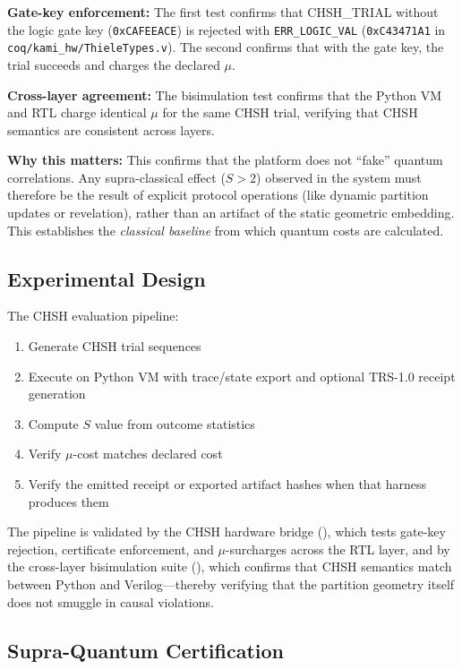 \textbf{Gate-key enforcement:} The first test confirms that CHSH\_TRIAL without the logic gate key (\texttt{0xCAFEEACE}) is rejected with \texttt{ERR\_LOGIC\_VAL} (\texttt{0xC43471A1} in \texttt{coq/kami\_hw/ThieleTypes.v}). The second confirms that with the gate key, the trial succeeds and charges the declared $\mu$.

\textbf{Cross-layer agreement:} The bisimulation test confirms that the Python VM and RTL charge identical $\mu$ for the same CHSH trial, verifying that CHSH semantics are consistent across layers.

\textbf{Why this matters:}
This confirms that the platform does not ``fake'' quantum correlations. Any supra-classical effect ($S > 2$) observed in the system must therefore be the result of explicit protocol operations (like dynamic partition updates or revelation), rather than an artifact of the static geometric embedding. This establishes the \textit{classical baseline} from which quantum costs are calculated.

\subsection{Experimental Design}

The CHSH evaluation pipeline:
\begin{enumerate}
    \item Generate CHSH trial sequences
    \item Execute on Python VM with trace/state export and optional TRS-1.0 receipt generation
    \item Compute $S$ value from outcome statistics
    \item Verify $\mu$-cost matches declared cost
    \item Verify the emitted receipt or exported artifact hashes when that harness produces them
\end{enumerate}
The pipeline is validated by the CHSH hardware bridge (), which tests gate-key rejection, certificate enforcement, and $\mu$-surcharges across the RTL layer, and by the cross-layer bisimulation suite (), which confirms that CHSH semantics match between Python and Verilog---thereby verifying that the partition geometry itself does not smuggle in causal violations.

\subsection{Supra-Quantum Certification}

